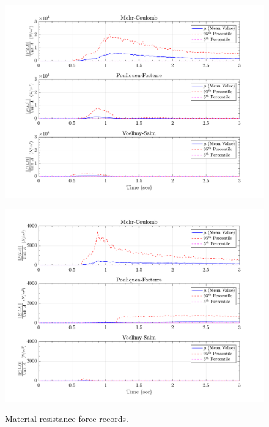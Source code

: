 \documentclass{article}
\begin{document}
\begin{figure}[H]
	\begin{minipage}[b]{0.5\linewidth}
    	\centering
    	\includegraphics[width=1\textwidth]{InclinedPlane/LocalRecords/Records/Fr_L15.png}
    	\label{fig:Ramp-L3-Fr}
	\end{minipage}
	\begin{minipage}[b]{0.5\linewidth}
		\centering
		\includegraphics[width=1\textwidth]{InclinedPlane/LocalRecords/Records/Fr_L17.png}
    	\label{fig:Ramp-L4-Fr}
    \end{minipage}
    \caption{Material resistance force records.}
    \label{fig:Ramp-LM-Fr}    
\end{figure}
\end{document}
